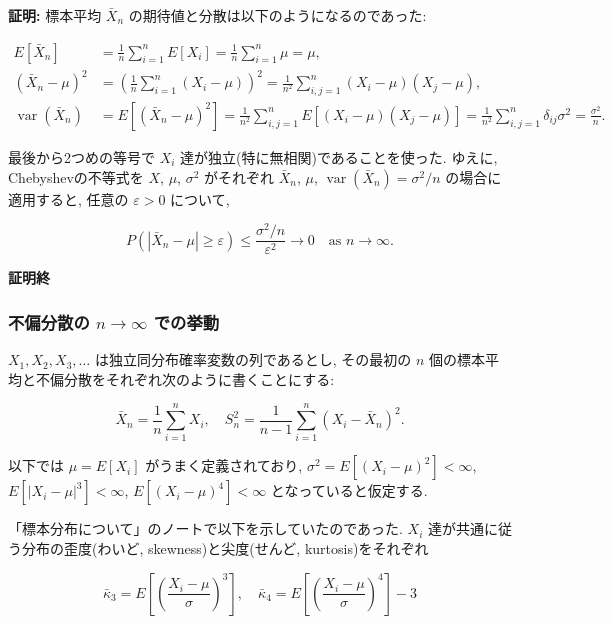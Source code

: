 \documentclass[10pt, a4paper,xelatex,ja=standard]{bxjsarticle}
\newcommand\op{\operatorname}
\newcommand\eps{\varepsilon}
\newcommand\bk{\bar\kappa}
\begin{document}
\textbf{証明:} 標本平均 \(\bar{X}_n\)
の期待値と分散は以下のようになるのであった:

\[
\begin{aligned}
E[\bar{X}_n] &= \frac{1}{n}\sum_{i=1}^n E[X_i]
= \frac{1}{n}\sum_{i=1}^n \mu = \mu,
\\
(\bar{X}_n - \mu)^2 &=
\left(\frac{1}{n}\sum_{i=1}^n(X_i-\mu)\right)^2 =
\frac{1}{n^2}\sum_{i,j=1}^n (X_i-\mu)(X_j-\mu),
\\
\op{var}(\bar{X}_n) &=
E[(\bar{X}_n - \mu)^2] =
\frac{1}{n^2}\sum_{i,j=1}^n E[(X_i-\mu)(X_j-\mu)] =
\frac{1}{n^2}\sum_{i,j=1}^n \delta_{ij}\sigma^2 =
\frac{\sigma^2}{n}.
\end{aligned}
\]

最後から2つめの等号で \(X_i\) 達が独立(特に無相関)であることを使った.
ゆえに, Chebyshevの不等式を \(X\), \(\mu\), \(\sigma^2\) がそれぞれ
\(\bar{X}_n\), \(\mu\), \(\op{var}(\bar{X}_n)=\sigma^2/n\)
の場合に適用すると, 任意の \(\eps>0\) について,

\[
P(|\bar{X}_n - \mu|\ge\eps) \le \frac{\sigma^2/n}{\eps^2} \to 0 \quad \text{as $n\to\infty$}.
\]

\textbf{証明終}

    \hypertarget{ux4e0dux504fux5206ux6563ux306e-ntoinfty-ux3067ux306eux6319ux52d5}{%
\subsubsection{\texorpdfstring{不偏分散の \(n\to\infty\)
での挙動}{不偏分散の n\textbackslash to\textbackslash infty での挙動}}\label{ux4e0dux504fux5206ux6563ux306e-ntoinfty-ux3067ux306eux6319ux52d5}}

\(X_1,X_2,X_3,\ldots\) は独立同分布確率変数の列であるとし, その最初の
\(n\) 個の標本平均と不偏分散をそれぞれ次のように書くことにする:

\[
\bar{X}_n = \frac{1}{n}\sum_{i=1}^n X_i, \quad
S_n^2 = \frac{1}{n-1}\sum_{i=1}^n (X_i - \bar{X}_n)^2.
\]

以下では \(\mu=E[X_i]\) がうまく定義されており,
\(\sigma^2=E[(X_i-\mu)^2]<\infty\), \(E[|X_i-\mu|^3]<\infty\),
\(E[(X_i-\mu)^4]<\infty\) となっていると仮定する.

「標本分布について」のノートで以下を示していたのであった. \(X_i\)
達が共通に従う分布の歪度(わいど, skewness)と尖度(せんど,
kurtosis)をそれぞれ

\[
\bk_3 = E\left[\left(\frac{X_i-\mu}{\sigma}\right)^3\right], \quad
\bk_4 = E\left[\left(\frac{X_i-\mu}{\sigma}\right)^4\right] - 3
\]
\end{document}
